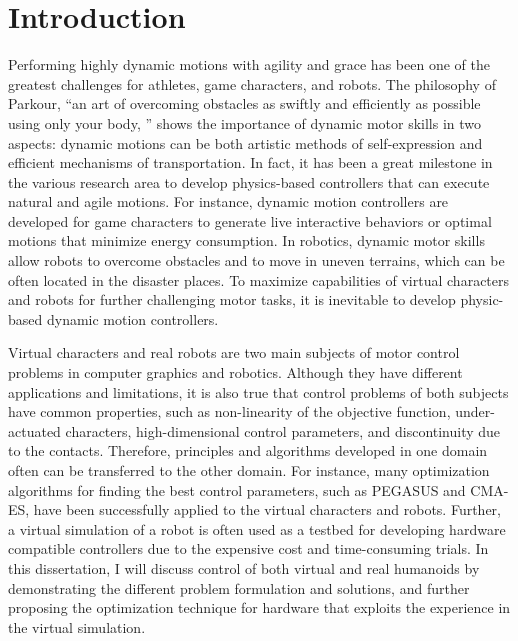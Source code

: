 \chapter{Introduction}
Performing highly dynamic motions with agility and grace has been one of the
greatest challenges for athletes, game characters, and robots.
The philosophy of Parkour, ``an art of overcoming obstacles as swiftly and
efficiently as possible using only your body, '' shows the importance of
dynamic motor skills in two aspects: dynamic motions can be both artistic 
methods of self-expression and efficient mechanisms of transportation. 
In fact, it has been a great milestone in the various research area
to develop physics-based controllers that can execute natural 
and agile motions.
For instance, dynamic motion controllers are developed 
for game characters to generate live interactive behaviors or optimal 
motions that minimize energy consumption.
In robotics, dynamic motor skills allow robots to overcome obstacles and
to move in uneven terrains, which can be often located in 
the disaster places.
To maximize capabilities of virtual characters and robots for 
further challenging motor tasks, it is inevitable to develop 
physic-based dynamic motion controllers.

Virtual characters and real robots are two main subjects of motor control
problems in computer graphics and robotics.
Although they have different applications and limitations,
it is also true that control problems of both subjects have common
properties, such as non-linearity of the objective function, 
under-actuated characters, high-dimensional control parameters, 
and discontinuity due to the contacts.
Therefore, principles and algorithms developed in one domain often can be
transferred to the other domain.
For instance, many optimization algorithms for finding the best control
parameters, such as PEGASUS and CMA-ES, have been successfully applied
to the virtual characters and robots.
Further, a virtual simulation of a robot is often used as a testbed for
developing hardware compatible controllers due to the expensive cost and
time-consuming trials.
In this dissertation, I will discuss control of both virtual and real humanoids
by demonstrating the different problem formulation and solutions, and further
proposing the optimization technique for hardware that exploits the experience
in the virtual simulation.

